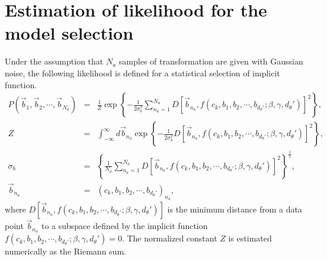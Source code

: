 \documentclass[preprint,
bibnotes,
 amsmath,amssymb,
 aps,
]{revtex4-1}
\newcounter{num}
\begin{document}
\section{Estimation of likelihood for the model selection}
\label{est_likeli}
Under the assumption that $N_a$ samples of transformation are given with Gaussian noise, the following likelihood is defined for a statistical selection of implicit function. 
\begin{eqnarray}
\label{likelihood}
P\left(\vec{b}_1,\vec{b}_2,\cdots,\vec{b}_{N_a}\right) &=& \frac{1}{Z}\exp\left\{ -\frac{1}{2\sigma_{b}^2}\sum_{n_a=1}^{N_a} D\left[\vec{b}_{n_a}, f(c_k, b_1,b_2,\cdots,b_{d_{\theta}'};\beta,\gamma,d_{\theta}')\right]^2 \right\},\\
\label{normalizeconstant}
Z &=& \int_{-\infty}^{\infty} d\vec{b}_{n_a} \exp\left\{ -\frac{1}{2\sigma_{b}^2}D\left[\vec{b}_{n_a}, f(c_k, b_1,b_2,\cdots,b_{d_{\theta}'};\beta,\gamma,d_{\theta}')\right]^2 \right\},\\
\sigma_{b} &=& \left\{\frac{1}{N_a} \sum_{n_a=1}^{N_a} D\left[\vec{b}_{n_a}, f(c_k, b_1,b_2,\cdots,b_{d_{\theta}'};\beta,\gamma,d_{\theta}')\right]^2\right\}^{\frac{1}{2}},\\
\vec{b}_{n_a} &=& (c_k, b_1,b_2,\cdots,b_{d_{\theta}'})_{n_a},
\end{eqnarray}
where $D\left[\vec{b}_{n_a}, f(c_k, b_1,b_2,\cdots,b_{d_{\theta}'};\beta,\gamma,d_{\theta}')\right]$ is the minimum distance from a data point $\vec{b}_{n_a}$ to a subspace defined by the implicit function $f(c_k, b_1,b_2,\cdots,b_{d_{\theta}'};\beta,\gamma,d_{\theta}') = 0$. 
The normalized constant $Z$ is estimated numerically as the Riemann sum. 
\end{document}
